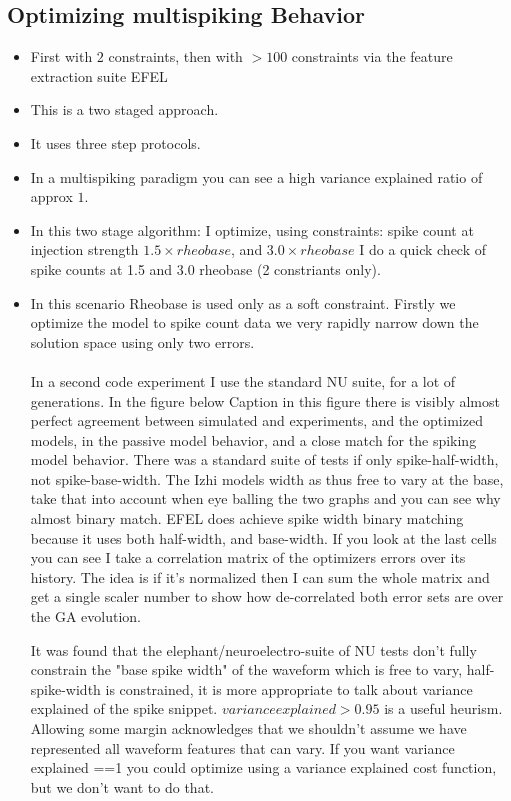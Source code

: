 \subsection{Optimizing multispiking Behavior}
\begin{itemize}
\item First with $2$ constraints, then with $>100$ constraints via the feature extraction suite EFEL

\item This is a two staged approach. 
\item It uses three step protocols.

\item In a multispiking paradigm you can see a high variance explained ratio of approx $1$.  

\item In this two stage algorithm: I optimize, using constraints: spike count at injection strength $1.5 \times rheobase $, and $3.0 \times rheobase $
I do a quick check of spike counts at 1.5 and 3.0 rheobase (2 constriants only).

\item In this scenario Rheobase is used only as a soft constraint. Firstly we optimize the model to spike count data we very rapidly narrow down the solution space using only two errors. \\
\\
In a second code experiment I use the standard NU suite, for a lot of generations. In the figure below
Caption in this figure there is visibly almost perfect agreement between simulated and experiments, and the optimized models, in the passive model behavior, and a close match for the spiking model behavior. There was a standard suite of tests if only spike-half-width, not spike-base-width. The Izhi models width as thus free to vary at the base, take that into account when eye balling the two graphs and you can see why almost binary match. EFEL does achieve spike width binary matching because it uses both half-width, and base-width. If you look at the last cells you can see I take a correlation matrix of the optimizers errors over its history. The idea is if it's normalized then I can sum the whole matrix and get a single scaler number to show how de-correlated both error sets are over the GA evolution. 

It was found that the elephant/neuroelectro-suite of NU tests don't fully constrain the "base spike width" of the waveform which is free to vary, half-spike-width is constrained, it is more appropriate to talk about variance explained of the spike snippet. $variance explained>0.95$ is a useful heurism. Allowing some margin acknowledges that we shouldn't assume we have represented all waveform features that can vary. If you want variance explained ==1   you could optimize using a variance explained cost function, but we don't want to do that. 
\end{itemize}


